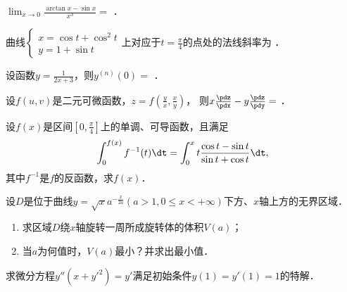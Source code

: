 \documentclass[plain,noanswer,medmath]{../../template/jnuexam}
\begin{document}






\begin{problem}
$\lim_{x \to 0} \frac{\arctan x - \sin x}{x^3} =$ \fillin{}．
\end{problem}


\begin{problem}
曲线$\begin{cases}
  x = \cos t + \cos^2 t \\
  y = 1 + \sin t
\end{cases}$上对应于$t = \frac{\pi}{4}$的点处的法线斜率为 \fillin{}．
\end{problem}


\begin{problem}
设函数$y = \frac{1}{2x + 3}$，则$y^{(n)}(0) =$ \fillin{}．
\end{problem}




\begin{problem}
设$f(u,v)$是二元可微函数，$z = f\left(\frac{y}{x},\frac{x}{y} \right)$，
则$x\frac{\pdz}{\pdx} - y\frac{\pdz}{\pdy} =$ \fillin{}．
\end{problem}






\begin{problem}[points=10]
设$f(x)$是区间$\left[0,\frac{\pi}{4} \right]$上的单调、可导函数，且满足
$$\int_0^{f(x)} f^{-1}(t) \dt = \int_0^x t \frac{\cos t - \sin t}{\sin t + \cos t}\dt,$$
其中$f^{-1}$是$f$的反函数，求$f(x)$．
\end{problem}


\begin{problem}[points=11]
设$D$是位于曲线$y = \sqrt{x} a^{- \frac{x}{2a}}(a > 1,0 \le x < +\infty)$下方、$x$轴上方的无界区域．
\begin{enumerate}
  \item 求区域$D$绕$x$轴旋转一周所成旋转体的体积$V(a)$；
  \item 当$a$为何值时，$V(a)$最小？并求出最小值．
\end{enumerate}
\end{problem}


\begin{problem}[points=11]
求微分方程$y''(x + y'^2) = y'$满足初始条件$y(1) = y'(1) = 1$的特解．
\end{problem}
\end{document}
